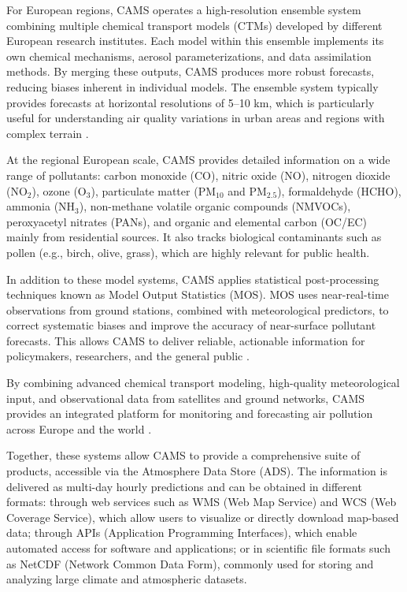 For European regions, CAMS operates a high-resolution ensemble system combining multiple chemical transport models (CTMs) developed by different European research institutes. Each model within this ensemble implements its own chemical mechanisms, aerosol parameterizations, and data assimilation methods. By merging these outputs, CAMS produces more robust forecasts, reducing biases inherent in individual models. The ensemble system typically provides forecasts at horizontal resolutions of 5–10 km, which is particularly useful for understanding air quality variations in urban areas and regions with complex terrain \cite{ecmwfCAMSRegional}.  

At the regional European scale, CAMS provides detailed information on a wide range of pollutants: carbon monoxide (CO), nitric oxide (NO), nitrogen dioxide (NO$_2$), ozone (O$_3$), particulate matter (PM$_{10}$ and PM$_{2.5}$), formaldehyde (HCHO), ammonia (NH$_3$), non-methane volatile organic compounds (NMVOCs), peroxyacetyl nitrates (PANs), and organic and elemental carbon (OC/EC) mainly from residential sources. It also tracks biological contaminants such as pollen (e.g., birch, olive, grass), which are highly relevant for public health.

In addition to these model systems, CAMS applies statistical post-processing techniques known as Model Output Statistics (MOS). MOS uses near-real-time observations from ground stations, combined with meteorological predictors, to correct systematic biases and improve the accuracy of near-surface pollutant forecasts. This allows CAMS to deliver reliable, actionable information for policymakers, researchers, and the general public \cite{copernicusModelOutput}.

By combining advanced chemical transport modeling, high-quality meteorological input, and observational data from satellites and ground networks, CAMS provides an integrated platform for monitoring and forecasting air pollution across Europe and the world \cite{copernicusCopernicus, ecmwfECMWF}. 

Together, these systems allow CAMS to provide a comprehensive suite of products, accessible via the Atmosphere Data Store (ADS). The information is delivered as multi-day hourly predictions and can be obtained in different formats: through web services such as WMS (Web Map Service) and WCS (Web Coverage Service), which allow users to visualize or directly download map-based data; through APIs (Application Programming Interfaces), which enable automated access for software and applications; or in scientific file formats such as NetCDF (Network Common Data Form), commonly used for storing and analyzing large climate and atmospheric datasets.


